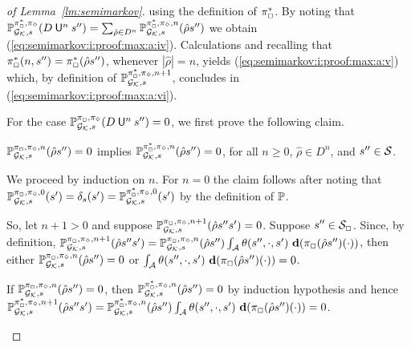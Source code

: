 \begin{proof}[of Lemma~\ref{lm:semimarkov}]
  using the definition of $\pi^*_{{\Box}}$.
  By noting that
  $\mathbb{P}^{\pi^*_{{\Box}},\pi_{{\Diamond}}}_{{\mathcal{G}_{\mathcal{K}}},s}(D \mathbin{\mathsf{U}}^n s'')=\sum_{\hat{\rho}\in D^n}\mathbb{P}^{\pi^*_{{\Box}},\pi_{{\Diamond}},n}_{{\mathcal{G}_{\mathcal{K}}},s}(\hat{\rho}s'')$
  we obtain (\ref{eq:semimarkov:i:proof:max:a:iv}).
  Calculations and recalling that
  $\pi^*_{{\Box}}(n,s'')=\pi^*_{{\Box}}(\hat{\rho}s'')$,
  whenever $|\hat{\rho}|=n$, yields
  (\ref{eq:semimarkov:i:proof:max:a:v}) which, by definition of
  $\mathbb{P}^{\pi^*_{{\Box}},\pi_{{\Diamond}},n+1}_{{\mathcal{G}_{\mathcal{K}}},s}$,
  concludes in (\ref{eq:semimarkov:i:proof:max:a:vi}).

  For the case
  $\mathbb{P}^{\pi_{{\Box}},\pi_{{\Diamond}}}_{{\mathcal{G}_{\mathcal{K}}},s}(D \mathbin{\mathsf{U}}^n s'') = 0$,
  we first prove the following claim.
  \begin{claim}
    $\mathbb{P}^{\pi_{{\Box}},\pi_{{\Diamond}},n}_{{\mathcal{G}_{\mathcal{K}}},s}(\hat{\rho}s'') = 0$
    implies
    $\mathbb{P}^{\pi^*_{{\Box}},\pi_{{\Diamond}},n}_{{\mathcal{G}_{\mathcal{K}}},s}(\hat{\rho}s'') = 0$,
    for all $n\geq0$, $\hat{\rho}\in D^n$, and $s''\in\mathcal{S}$.
  \end{claim}
  \begin{proofofclaim}
    We proceed by induction on $n$.  For $n=0$ the claim follows after
    noting that
    $\mathbb{P}^{\pi_{{\Box}},\pi_{{\Diamond}},0}_{{\mathcal{G}_{\mathcal{K}}},s}(s') =
    \delta_s(s') =
    \mathbb{P}^{\pi^*_{{\Box}},\pi_{{\Diamond}},0}_{{\mathcal{G}_{\mathcal{K}}},s}(s')$
    by the definition of $\mathbb{P}$.

    So, let $n+1>0$ and suppose
    $\mathbb{P}^{\pi_{{\Box}},\pi_{{\Diamond}},n+1}_{{\mathcal{G}_{\mathcal{K}}},s}(\hat{\rho}s''s') = 0$.
    Suppose $s''\in\mathcal{S}_{\Box}$. Since, by definition,
    $\Prob^{\strat_{\maxplay},\strat_{\minplay},n+1}_{\StochGK,s}(\hat{\rho}s''s') =
    \Prob^{\strat_{\maxplay},\strat_{\minplay},n}_{\StochGK,s}(\hat{\rho}s'')\int_{\sgactions}\sgtrans(s'',\cdot,s')\ \diff(\strat_{\maxplay}(\hat{\rho}s'')(\cdot))$,
    then either
    $\mathbb{P}^{\pi_{{\Box}},\pi_{{\Diamond}},n}_{{\mathcal{G}_{\mathcal{K}}},s}(\hat{\rho}s'') = 0$
    or
    $\int_{\sgactions}\sgtrans(s'',\cdot,s')\ \diff(\strat_{\maxplay}(\hat{\rho}s'')(\cdot)) = 0$.

    If
    $\mathbb{P}^{\pi_{{\Box}},\pi_{{\Diamond}},n}_{{\mathcal{G}_{\mathcal{K}}},s}(\hat{\rho}s'') = 0$,
    then
    $\mathbb{P}^{\pi^*_{{\Box}},\pi_{{\Diamond}},n}_{{\mathcal{G}_{\mathcal{K}}},s}(\hat{\rho}s'') = 0$
    by induction hypothesis and hence
    $\Prob^{\starredstrat_{\maxplay},\strat_{\minplay},n+1}_{\StochGK,s}(\hat{\rho}s''s') =
    \Prob^{\starredstrat_{\maxplay},\strat_{\minplay},n}_{\StochGK,s}(\hat{\rho}s'')\int_{\sgactions}\sgtrans(s'',\cdot,s')\ \diff(\strat_{\maxplay}(\hat{\rho}s'')(\cdot))=0$.


\end{proofofclaim}
\end{proof}
